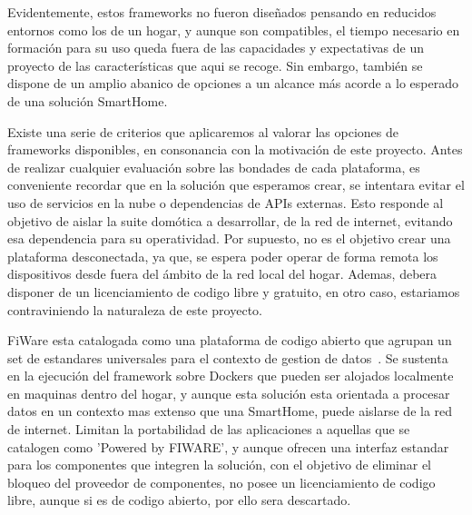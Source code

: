 \vspace{1.5cm}

Evidentemente, estos frameworks no fueron diseñados pensando en reducidos entornos como los de un hogar, y aunque son compatibles, el tiempo necesario en formación para su uso queda fuera de las capacidades y expectativas de un proyecto de las características que aqui se recoge. Sin embargo, también se dispone de un amplio abanico de opciones a un alcance más acorde a lo esperado de una solución SmartHome.

\vspace{1.5cm}

Existe una serie de criterios que aplicaremos al valorar las opciones de frameworks disponibles, en consonancia con la motivación de este proyecto. Antes de realizar cualquier evaluación sobre las bondades de cada plataforma, es conveniente recordar que en la solución que esperamos crear, se intentara evitar el uso de servicios en la nube o dependencias de APIs externas. Esto responde al objetivo de aislar la suite domótica a desarrollar, de la red de internet, evitando esa dependencia para su operatividad. Por supuesto, no es el objetivo crear una plataforma desconectada, ya que, se espera poder operar de forma remota los dispositivos desde fuera del ámbito de la red local del hogar. Ademas, debera disponer de un licenciamiento de codigo libre y gratuito, en otro caso, estariamos contraviniendo la naturaleza de este proyecto.

\vspace{1.5cm}

FiWare esta catalogada como una plataforma de codigo abierto que agrupan un set de estandares universales para el contexto de gestion de datos~\cite{whatisfiware}. Se sustenta en la ejecución del framework sobre Dockers que pueden ser alojados localmente en maquinas dentro del hogar, y aunque esta solución esta orientada a procesar datos en un contexto mas extenso que una SmartHome, puede aislarse de la red de internet. Limitan la portabilidad de las aplicaciones a aquellas que se catalogen como 'Powered by FIWARE', y aunque ofrecen una interfaz estandar para los componentes que integren la solución, con el objetivo de eliminar el bloqueo del proveedor de componentes, no posee un licenciamiento de codigo libre, aunque si es de codigo abierto, por ello sera descartado.

\vspace{1.5cm}

